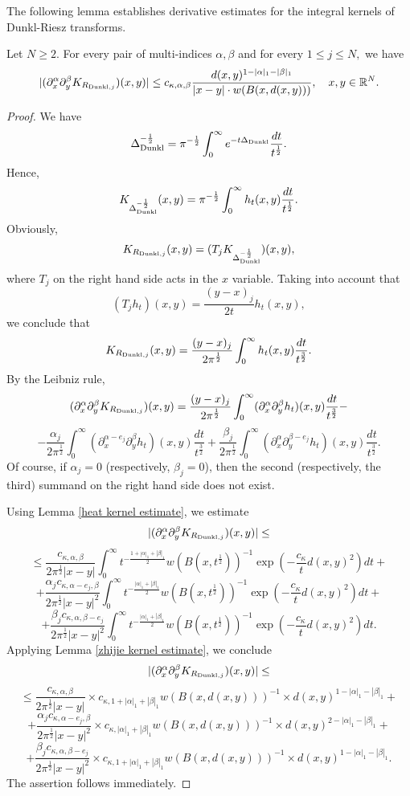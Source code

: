 \documentclass{amsart}
\begin{document}
The following lemma establishes derivative estimates for the integral kernels of Dunkl-Riesz transforms.
\begin{lemma}\label{lem:Dunkl-Riesz-endpoint-derivatives}
Let $N\geq 2.$ For every pair of multi-indices $\alpha,\beta$ and for every $1\leq j\leq N,$ we have
$$|(\partial_x^{\alpha}\partial_y^{\beta}K_{R_{{\rm Dunkl},j}})(x,y)|
\leq c_{\kappa,\alpha,\beta}\frac{d(x,y)^{1-|\alpha|_1-|\beta|_1}}{|x-y|\cdot w(B(x,d(x,y)))},\quad x,y\in\mathbb{R}^N.$$
\end{lemma}
\begin{proof} We have
$$\Delta_{{\rm Dunkl}}^{-\frac12}=\pi^{-\frac12}\int_0^{\infty}e^{-t\Delta_{{\rm Dunkl}}}\frac{dt}{t^{\frac12}}.$$
Hence,
$$K_{\Delta_{{\rm Dunkl}}^{-\frac12}}(x,y)=\pi^{-\frac12}\int_0^{\infty}h_t(x,y)\frac{dt}{t^{\frac12}}.$$
Obviously,
$$K_{R_{{\rm Dunkl},j}}(x,y)=(T_jK_{\Delta_{{\rm Dunkl}}^{-\frac12}})(x,y),$$
where $T_j$ on the right hand side acts in the $x$ variable. Taking into account that
$$(T_jh_t)(x,y)=\frac{(y-x)_j}{2t}h_t(x,y),$$
we conclude that
$$K_{R_{{\rm Dunkl},j}}(x,y)=\frac{(y-x)_j}{2\pi^{\frac12}}\int_0^{\infty}h_t(x,y)\frac{dt}{t^{\frac32}}.$$
By the Leibniz rule,
$$(\partial_x^{\alpha}\partial_y^{\beta}K_{R_{{\rm Dunkl},j}})(x,y)=\frac{(y-x)_j}{2\pi^{\frac12}}\int_0^{\infty}(\partial_x^{\alpha}\partial_y^{\beta}h_t)(x,y)\frac{dt}{t^{\frac32}}-$$
$$-\frac{\alpha_j}{2\pi^{\frac12}}\int_0^{\infty}(\partial_x^{\alpha-e_j}\partial_y^{\beta}h_t)(x,y)\frac{dt}{t^{\frac32}}+\frac{\beta_j}{2\pi^{\frac12}}\int_0^{\infty}(\partial_x^{\alpha}\partial_y^{\beta-e_j}h_t)(x,y)\frac{dt}{t^{\frac32}}.$$
Of course, if $\alpha_j=0$ (respectively, $\beta_j=0$), then the second (respectively, the third) summand on the right hand side does not exist.

Using Lemma \ref{heat kernel estimate}, we estimate
$$|(\partial_x^{\alpha}\partial_y^{\beta}K_{R_{{\rm Dunkl},j}})(x,y)|\leq$$
$$\leq \frac{c_{\kappa,\alpha,\beta}}{2\pi^{\frac12}|x-y|}\int_0^{\infty}t^{-\frac{1+|\alpha|_1+|\beta|_1}{2}}w(B(x,t^{\frac12}))^{-1}\exp(-\frac{c_{\kappa}}{t}d(x,y)^2)dt+$$
$$+\frac{\alpha_jc_{\kappa,\alpha-e_j,\beta}}{2\pi^{\frac12}|x-y|^2}\int_0^{\infty}t^{-\frac{|\alpha|_1+|\beta|_1}{2}}w(B(x,t^{\frac12}))^{-1}\exp(-\frac{c_{\kappa}}{t}d(x,y)^2)dt+$$
$$+\frac{\beta_jc_{\kappa,\alpha,\beta-e_j}}{2\pi^{\frac12}|x-y|^2}\int_0^{\infty}t^{-\frac{|\alpha|_1+|\beta|_1}{2}}w(B(x,t^{\frac12}))^{-1}\exp(-\frac{c_{\kappa}}{t}d(x,y)^2)dt.$$
Applying Lemma \ref{zhijie kernel estimate}, we conclude
$$|(\partial_x^{\alpha}\partial_y^{\beta}K_{R_{{\rm Dunkl},j}})(x,y)|\leq$$
$$\leq \frac{c_{\kappa,\alpha,\beta}}{2\pi^{\frac12}|x-y|}\times c_{\kappa,1+|\alpha|_1+|\beta|_1}w(B(x,d(x,y)))^{-1}\times d(x,y)^{1-|\alpha|_1-|\beta|_1}+$$
$$+\frac{\alpha_jc_{\kappa,\alpha-e_j,\beta}}{2\pi^{\frac12}|x-y|^2}\times c_{\kappa,|\alpha|_1+|\beta|_1}w(B(x,d(x,y)))^{-1}\times d(x,y)^{2-|\alpha|_1-|\beta|_1}+$$
$$+\frac{\beta_jc_{\kappa,\alpha,\beta-e_j}}{2\pi^{\frac12}|x-y|^2}\times c_{\kappa,1+|\alpha|_1+|\beta|_1}w(B(x,d(x,y)))^{-1}\times d(x,y)^{1-|\alpha|_1-|\beta|_1}.$$
The assertion follows immediately.
\end{proof}
\end{document}
